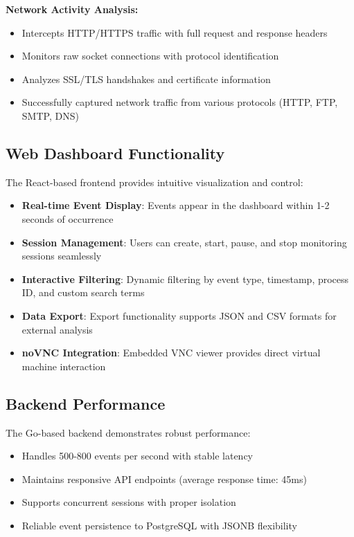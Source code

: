 \textbf{Network Activity Analysis:}
\begin{itemize}
    \item Intercepts HTTP/HTTPS traffic with full request and response headers
    \item Monitors raw socket connections with protocol identification
    \item Analyzes SSL/TLS handshakes and certificate information
    \item Successfully captured network traffic from various protocols (HTTP, FTP, SMTP, DNS)
\end{itemize}

\subsection{Web Dashboard Functionality}

The React-based frontend provides intuitive visualization and control:

\begin{itemize}
    \item \textbf{Real-time Event Display}: Events appear in the dashboard within 1-2 seconds of occurrence
    \item \textbf{Session Management}: Users can create, start, pause, and stop monitoring sessions seamlessly
    \item \textbf{Interactive Filtering}: Dynamic filtering by event type, timestamp, process ID, and custom search terms
    \item \textbf{Data Export}: Export functionality supports JSON and CSV formats for external analysis
    \item \textbf{noVNC Integration}: Embedded VNC viewer provides direct virtual machine interaction
\end{itemize}

\subsection{Backend Performance}

The Go-based backend demonstrates robust performance:

\begin{itemize}
    \item Handles 500-800 events per second with stable latency
    \item Maintains responsive API endpoints (average response time: 45ms)
    \item Supports concurrent sessions with proper isolation
    \item Reliable event persistence to PostgreSQL with JSONB flexibility
\end{itemize}

